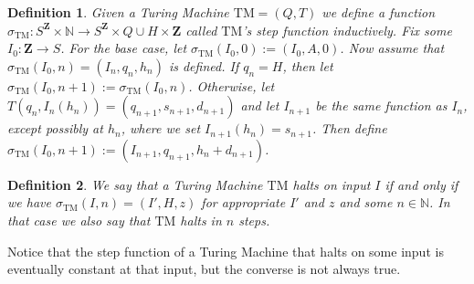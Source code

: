 \documentclass[leqno]{article}
\newtheorem{definition}{Definition}[section]
\newcommand{\N}{\mathbb{N}}
\newcommand{\Z}{\mathbf{Z}}
\newcommand{\step}[1]{\sigma_{\mathrm{#1}}}
\begin{document}
\begin{definition}
  Given a Turing Machine $\mathrm{TM} = (Q, T)$ we define a function $\step{TM}: S^{\Z} \times \N \to S^{\Z} \times Q \cup {H} \times \Z$ called $\mathrm{TM}$'s step function inductively. Fix some $I_0: \Z \to S$. For the base case, let $\step{TM}(I_0, 0) := (I_0, A, 0)$. Now assume that $\step{TM}(I_0, n) = (I_n, q_n, h_n)$ is defined. If $q_n = H$, then let $\step{TM}(I_0, n+1) := \step{TM}(I_0, n)$. Otherwise, let $T(q_n, I_n(h_n)) = (q_{n+1}, s_{n+1}, d_{n+1})$ and let $I_{n+1}$ be the same function as $I_n$, except possibly at $h_n$, where we set $I_{n+1}(h_n) = s_{n+1}$. Then define $\step{TM}(I_0, n+1) := (I_{n+1}, q_{n+1}, h_n+d_{n+1})$.
\end{definition}

\begin{definition}
  We say that a Turing Machine $\mathrm{TM}$ halts on input $I$ if and only if we have $\step{TM}(I, n) = (I', H, z)$ for appropriate $I'$ and $z$ and some $n \in \N$. In that case we also say that $\mathrm{TM}$ halts in $n$ steps. 
\end{definition}

Notice that the step function of a Turing Machine that halts on some input is eventually constant at that input, but the converse is not always true.
\end{document}
